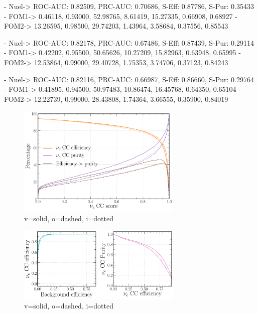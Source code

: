 - Nuel-> ROC-AUC: 0.82509, PRC-AUC: 0.70686, S-Eff: 0.87786, S-Pur: 0.35433
- FOM1-> 0.46118, 0.93000, 52.98765, 8.61419, 15.27335, 0.66908, 0.68927
- FOM2-> 13.26595, 0.98500, 29.74203, 1.43964, 3.58684, 0.37556, 0.85543

- Nuel-> ROC-AUC: 0.82178, PRC-AUC: 0.67486, S-Eff: 0.87439, S-Pur: 0.29114
- FOM1-> 0.42202, 0.95500, 50.65626, 10.27209, 15.82963, 0.63948, 0.65995
- FOM2-> 12.53864, 0.99000, 29.40728, 1.75353, 3.74706, 0.37123, 0.84243

- Nuel-> ROC-AUC: 0.82116, PRC-AUC: 0.66987, S-Eff: 0.86660, S-Pur: 0.29764
- FOM1-> 0.41895, 0.94500, 50.97483, 10.86474, 16.45768, 0.64350, 0.65104
- FOM2-> 12.22739, 0.99000, 28.43808, 1.74364, 3.66555, 0.35900, 0.84019

\begin{figure} %
    \includegraphics[width=0.7\textwidth]{diagrams/6-cvn/chipsnet/repr_nuel_eff_curves.pdf}
    \caption[repr nuel eff curves short]
    {v=solid, o=dashed, i=dotted}
    \label{fig:repr_nuel_eff_curves}
\end{figure}

\begin{figure} %
    \includegraphics[width=0.7\textwidth]{diagrams/6-cvn/chipsnet/repr_nuel_comp_curves.pdf}
    \caption[repr nuel comp curves short]
    {v=solid, o=dashed, i=dotted}
    \label{fig:repr_nuel_comp_curves}
\end{figure}

